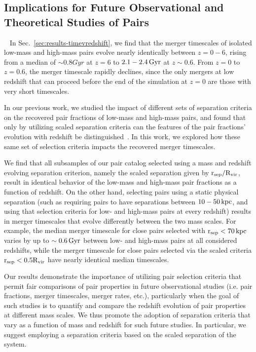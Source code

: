 \documentclass[twocolumn,linenumbers]{aastex631}
\begin{document}
    \subsection{Implications for Future Observational and Theoretical Studies of Pairs}~\label{sec:disc-suggestions}
    In Sec.~\ref{sec:results-timevredshift}, we find that the merger timescales of isolated low-mass and high-mass pairs evolve nearly identically between $z=0-6$, rising from a median of $\sim0.8Gyr$ at $z=6$ to $2.1-2.4\mathrm{\,Gyr}$ at $z\sim0.6$.
    From $z=0$ to $z=0.6$, the merger timescale rapidly declines, since the only mergers at low redshift that can proceed before the end of the simulation at $z=0$ are those with very short timescales.

    In our previous work, we studied the impact of different sets of separation criteria on the recovered pair fractions of low-mass and high-mass pairs, and found that only by utilizing scaled separation criteria can the features of the pair fractions' evolution with redshift be distinguished~\citep{Chamberlain2024}. 
    In this work, we explored how these same set of selection criteria impacts the recovered merger timescales. 

    We find that all subsamples of our pair catalog selected using a mass and redshift evolving separation criterion, namely the scaled separation given by $\rm r_{sep}/\rm R_{vir}$, result in identical behavior of the low-mass and high-mass pair fractions as a function of redshift. 
    On the other hand, selecting pairs using a static physical separation (such as requiring pairs to have separations between $10-50\mathrm{\,kpc}$, and using that selection criteria for low- and high-mass pairs at every redshift) results in merger timescales that evolve differently between the two mass scales. 
    For example, the median merger timescale for close pairs selected with $\rm r_{sep}<70\mathrm{\,kpc}$ varies by up to $\sim0.6\mathrm{\,Gyr}$ between low- and high-mass pairs at all considered redshifts, while the merger timescale for close pairs selected via the scaled criteria $\rm r_{sep}<0.5\rm R_{vir}$ have nearly identical median timescales. 

    Our results demonstrate the importance of utilizing pair selection criteria that permit fair comparisons of pair properties in future observational studies (i.e. pair fractions, merger timescales, merger rates, etc.), particularly when the goal of such studies is to quantify and compare the redshift evolution of pair properties at different mass scales. 
    We thus promote the adoption of separation criteria that vary as a function of mass and redshift for such future studies. 
    In particular, we suggest employing a separation criteria based on the scaled separation of the system. 
\end{document}
